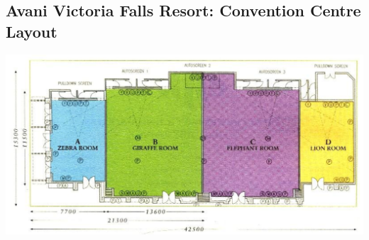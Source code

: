 \subsection{Avani Victoria Falls Resort: Convention Centre Layout}

\begin{center}
\includegraphics[width=\linewidth]{images/img-etd24-avani_victoria_fall_convention_centre_layout.png}
\end{center}

